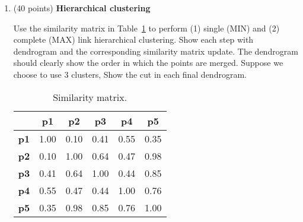 \documentclass[11pt]{article}
\begin{document}
\begin{enumerate}

    \item (40 points) \textbf{Hierarchical clustering}

    Use the similarity matrix in Table~\ref{tb:exp1} to perform
    (1) single (MIN) and (2) complete (MAX) link hierarchical
    clustering. Show each step with dendrogram and the
    corresponding similarity matrix update. The dendrogram should
    clearly show the order in which the points are merged.
    Suppose we choose to use 3 clusters, Show the cut in each
    final dendrogram.

    \begin{table}[ht]\label{tb:exp1}
        \centering
        \caption{Similarity matrix.}

        \begin{tabular}{ l| c | c | c | c | c}\hline
                   & \textbf{p1} & \textbf{p2} & \textbf{p3} & \textbf{p4} & \textbf{p5} \\ \hline
            \bf p1 & 1.00        & 0.10        & 0.41        & 0.55        & 0.35        \\
            \bf p2 & 0.10        & 1.00        & 0.64        & 0.47        & 0.98        \\
            \bf p3 & 0.41        & 0.64        & 1.00        & 0.44        & 0.85        \\
            \bf p4 & 0.55        & 0.47        & 0.44        & 1.00        & 0.76        \\
            \bf p5 & 0.35        & 0.98        & 0.85        & 0.76        & 1.00        \\
            \hline
        \end{tabular}
    \end{table}


\end{enumerate}
\end{document}

